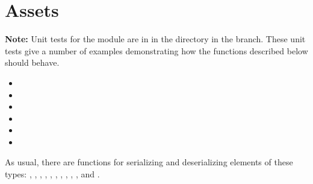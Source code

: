 

\section{Assets}


{\bf{Note:}} Unit tests for the {} module are in {}
in the {}
directory in the {} branch.
These unit tests give a number of examples demonstrating how the functions described below should behave.

\begin{itemize}
\item {}
\item {}
\item {}
\item {}
\item {}
\item {}
\end{itemize}

As usual, there are functions for serializing and deserializing elements of these types:
{},
{},
{},
{},
{},
{},
{},
{},
{},
{},
{}
and
{}.



